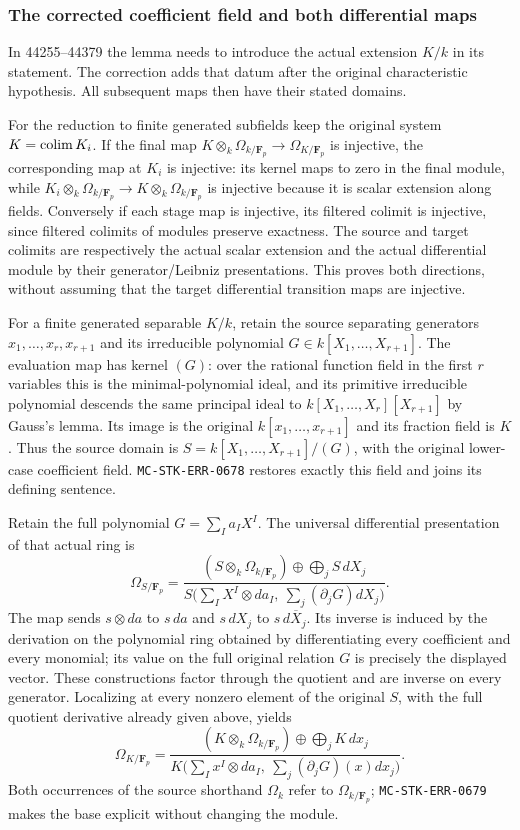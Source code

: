 \subsubsection{The corrected coefficient field and both differential maps}\label{the-corrected-coefficient-field-and-both-differential-maps}

In 44255--44379 the lemma needs to introduce the actual extension \(K/k\) in its statement. The correction adds that datum after the original characteristic hypothesis. All subsequent maps then have their stated domains.

For the reduction to finite generated subfields keep the original system \(K=\mathop{\rm colim}K_i\). If the final map \(K\otimes_k\Omega_{k/\mathbf F_p}\to\Omega_{K/\mathbf F_p}\) is injective, the corresponding map at \(K_i\) is injective: its kernel maps to zero in the final module, while \(K_i\otimes_k\Omega_{k/\mathbf F_p}\to K\otimes_k\Omega_{k/\mathbf F_p}\) is injective because it is scalar extension along fields. Conversely if each stage map is injective, its filtered colimit is injective, since filtered colimits of modules preserve exactness. The source and target colimits are respectively the actual scalar extension and the actual differential module by their generator/Leibniz presentations. This proves both directions, without assuming that the target differential transition maps are injective.

For a finite generated separable \(K/k\), retain the source separating generators \(x_1,\ldots,x_r,x_{r+1}\) and its irreducible polynomial \(G\in k[X_1,\ldots,X_{r+1}]\). The evaluation map has kernel \((G)\): over the rational function field in the first \(r\) variables this is the minimal-polynomial ideal, and its primitive irreducible polynomial descends the same principal ideal to \(k[X_1,\ldots,X_r][X_{r+1}]\) by Gauss's lemma. Its image is the original \(k[x_1,\ldots,x_{r+1}]\) and its fraction field is \(K\). Thus the source domain is \(S=k[X_1,\ldots,X_{r+1}]/(G)\), with the original lower-case coefficient field. \texttt{MC-STK-ERR-0678} restores exactly this field and joins its defining sentence.

Retain the full polynomial \(G=\sum_I a_I X^I\). The universal differential presentation of that actual ring is \[
 \Omega_{S/\mathbf F_p}=
 \frac{(S\otimes_k\Omega_{k/\mathbf F_p})\oplus\bigoplus_j S\,dX_j}
 {S\bigl(\sum_I X^I\otimes da_I,\ \sum_j(\partial_jG)dX_j\bigr)}.
\] The map sends \(s\otimes da\) to \(s\,da\) and \(s\,dX_j\) to \(s\,d\overline X_j\). Its inverse is induced by the derivation on the polynomial ring obtained by differentiating every coefficient and every monomial; its value on the full original relation \(G\) is precisely the displayed vector. These constructions factor through the quotient and are inverse on every generator. Localizing at every nonzero element of the original \(S\), with the full quotient derivative already given above, yields \[
 \Omega_{K/\mathbf F_p}=
 \frac{(K\otimes_k\Omega_{k/\mathbf F_p})\oplus\bigoplus_j K\,dx_j}
 {K\bigl(\sum_I x^I\otimes da_I,\ \sum_j(\partial_jG)(x)dx_j\bigr)}.
\] Both occurrences of the source shorthand \(\Omega_k\) refer to \(\Omega_{k/\mathbf F_p}\); \texttt{MC-STK-ERR-0679} makes the base explicit without changing the module.

